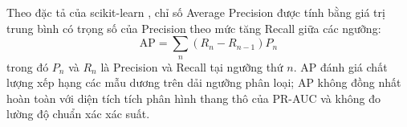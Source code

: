Theo đặc tả của scikit-learn \cite{scikit_learn_ap}, chỉ số Average Precision được tính bằng giá trị trung bình có trọng số của Precision theo mức tăng Recall giữa các ngưỡng:
\begin{equation}
    \text{AP} = \sum_{n} (R_n - R_{n-1}) P_n
\end{equation}
trong đó $P_n$ và $R_n$ là Precision và Recall tại ngưỡng thứ $n$. AP đánh giá chất lượng xếp hạng các mẫu dương trên dải ngưỡng phân loại; AP không đồng nhất hoàn toàn với diện tích tích phân hình thang thô của PR-AUC và không đo lường độ chuẩn xác xác suất.
